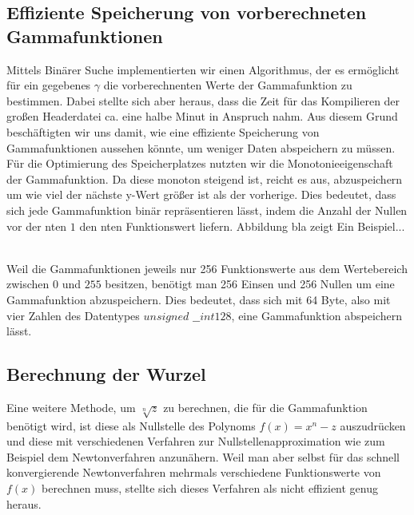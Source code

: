 \documentclass[course=erap]{aspdoc}
\begin{document}
\subsection{Effiziente Speicherung von vorberechneten Gammafunktionen}
Mittels Binärer Suche implementierten wir einen Algorithmus, der es ermöglicht für ein gegebenes $\gamma$ die vorberechnenten Werte der Gammafunktion zu bestimmen.  Dabei stellte sich aber heraus, dass die Zeit für das Kompilieren der großen Headerdatei ca. eine halbe Minut in Anspruch nahm. Aus diesem Grund beschäftigten wir uns damit, wie eine effiziente Speicherung von Gammafunktionen aussehen könnte, um weniger Daten abspeichern zu müssen. 
\\
\newline
\noindent
Für die Optimierung des Speicherplatzes nutzten wir die Monotonieeigenschaft der Gammafunktion. Da diese monoton steigend ist, reicht es aus, abzuspeichern um wie viel der nächste y-Wert größer ist als der vorherige. Dies bedeutet, dass sich jede Gammafunktion binär repräsentieren lässt, indem die Anzahl der Nullen vor der nten $1$ den nten Funktionswert liefern. Abbildung bla zeigt Ein Beispiel...

\\
\newline
\noindent
Weil die Gammafunktionen jeweils nur 256 Funktionswerte aus dem Wertebereich zwischen $0$ und $255$ besitzen, benötigt man 256 Einsen und 256 Nullen um eine Gammafunktion abzuspeichern. Dies bedeutet, dass sich mit 64 Byte, also mit vier Zahlen des Datentypes $unsigned$   $\_\_int128$, eine Gammafunktion abspeichern lässt. 
\subsection{Berechnung der Wurzel}
Eine weitere Methode, um $\sqrt[n]{z}$ zu berechnen, die für die Gammafunktion benötigt wird, ist diese als Nullstelle des Polynoms $f(x)=x^n-z$ auszudrücken und diese mit verschiedenen Verfahren zur Nullstellenapproximation wie zum Beispiel dem Newtonverfahren anzunähern. Weil man aber selbst für das schnell konvergierende Newtonverfahren mehrmals verschiedene Funktionswerte von $f(x)$ berechnen muss, stellte sich dieses Verfahren als nicht effizient genug heraus.     
\end{document}
